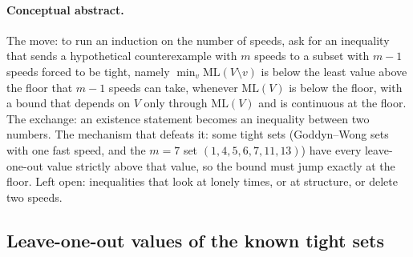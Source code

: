 \documentclass[11pt]{article}
\theoremstyle{remark}
\newcommand{\ML}{\mathrm{ML}}
\begin{document}
\paragraph{Conceptual abstract.} The move: to run an induction on the number of speeds, ask for an inequality that sends a hypothetical counterexample with $m$ speeds to a subset with $m-1$ speeds forced to be tight, namely $\min_v\ML(V\setminus v)$ is below the least value above the floor that $m-1$ speeds can take, whenever $\ML(V)$ is below the floor, with a bound that depends on $V$ only through $\ML(V)$ and is continuous at the floor. The exchange: an existence statement becomes an inequality between two numbers. The mechanism that defeats it: some tight sets (Goddyn--Wong sets with one fast speed, and the $m=7$ set $(1,4,5,6,7,11,13)$) have every leave-one-out value strictly above that value, so the bound must jump exactly at the floor. Left open: inequalities that look at lonely times, or at structure, or delete two speeds.

\subsection{Leave-one-out values of the known tight sets}
\end{document}
